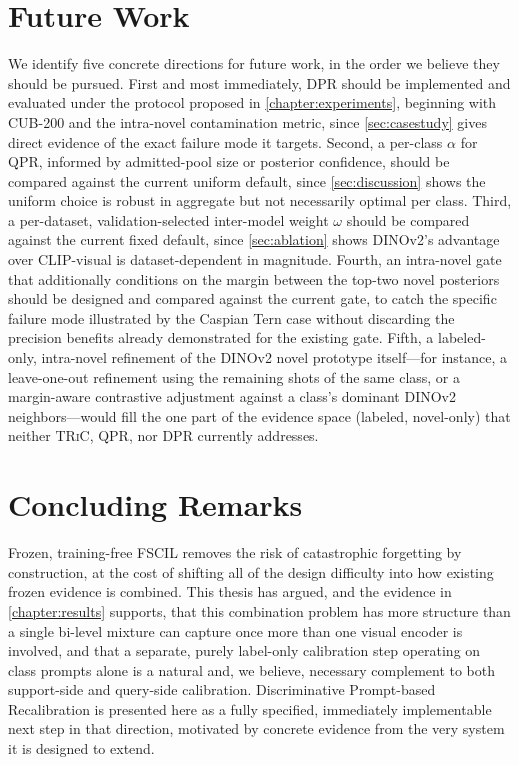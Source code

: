 \documentclass{iutbscthesis}
\begin{document}
\section{Future Work}
\label{sec:futurework}

We identify five concrete directions for future work, in the order we believe they should be pursued. First and most immediately, DPR should be implemented and evaluated under the protocol proposed in \autoref{chapter:experiments}, beginning with CUB-200 and the intra-novel contamination metric, since \autoref{sec:casestudy} gives direct evidence of the exact failure mode it targets. Second, a per-class $\alpha$ for QPR, informed by admitted-pool size or posterior confidence, should be compared against the current uniform default, since \autoref{sec:discussion} shows the uniform choice is robust in aggregate but not necessarily optimal per class. Third, a per-dataset, validation-selected inter-model weight $\omega$ should be compared against the current fixed default, since \autoref{sec:ablation} shows DINOv2's advantage over CLIP-visual is dataset-dependent in magnitude. Fourth, an intra-novel gate that additionally conditions on the margin between the top-two novel posteriors should be designed and compared against the current gate, to catch the specific failure mode illustrated by the Caspian Tern case without discarding the precision benefits already demonstrated for the existing gate. Fifth, a labeled-only, intra-novel refinement of the DINOv2 novel prototype itself---for instance, a leave-one-out refinement using the remaining shots of the same class, or a margin-aware contrastive adjustment against a class's dominant DINOv2 neighbors---would fill the one part of the evidence space (labeled, novel-only) that neither \textsc{TRiC}, QPR, nor DPR currently addresses.

\section{Concluding Remarks}

Frozen, training-free FSCIL removes the risk of catastrophic forgetting by construction, at the cost of shifting all of the design difficulty into how existing frozen evidence is combined. This thesis has argued, and the evidence in \autoref{chapter:results} supports, that this combination problem has more structure than a single bi-level mixture can capture once more than one visual encoder is involved, and that a separate, purely label-only calibration step operating on class prompts alone is a natural and, we believe, necessary complement to both support-side and query-side calibration. Discriminative Prompt-based Recalibration is presented here as a fully specified, immediately implementable next step in that direction, motivated by concrete evidence from the very system it is designed to extend.
\end{document}
